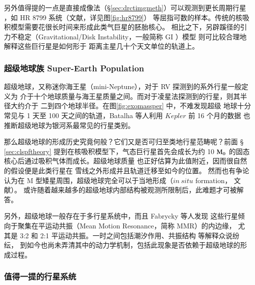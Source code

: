 另外值得提的一点是直接成像法（\S \ref{sec:drctimgmeth}）可以观测到更长周期行星
，如 HR 8799 系统（文献，详见图\ref{fig:hr8799}）
等屈指可数的样本。传统的核吸积模型需要花很长时间来形成此类气巨星的胚胎核心。
相比之下，另辟蹊径的引力不稳定（Gravitational/Disk Instability，一般简称 GI ）模型
\cite{Kuiper1951,Cameron1978,Boss1997}则可比较合理地解释这些巨行星是如何形于
距离主星几十个天文单位的轨道上\cite{Durisen2007}。



\subsubsection{超级地球族  Super-Earth Population}

超级地球，又称迷你海王星（mini-Neptune），对于 RV 探测到的系外行星一般定义为
介于十个地球质量与海王星质量之间。而对于凌星法探测到的行星，则其半径大约介于
二到四个地球半径\cite{Haghighipour2011}。在图\ref{fig:exomassper} 中，不难发现超级
地球十分常见与 1 天至 100 天之间的轨道，Batalha 等人利用 $Kepler$ 前 16 个月的数据
也推断超级地球为银河系最常见的行星类别\cite{Batalha2013}。

那么超级地球的形成历史究竟何般？它们又是否可归至类地行星范畴呢？前面 \S 
\ref{sec:clspftheory} 提到在核吸积模型下，气态巨行星首先会成长为约 10 
$\mathrm{M}_\oplus$ 的固态核心后通过吸积气体而成长\cite{Guillot2005}。超级地球质量
也正好估算为此值附近\cite{Lissauer2011MRR}，因而很自然的假设便是此类行星在
雪线之外形成并且轨道迁移至如今的位置\cite{Terquem2007,Kennedy2008,IdaLin2008}。
然而也有争论认为在 M 型矮星周围，超级地球完全可以于当地形成（$in\:situ$ formation，
文献）。
或许随着越来越多的超级地球内部结构被观测所限制后，此难题才可被解答\cite{Lissauer2014}。

另外，超级地球一般存在于多行星系统中\cite{Borucki2011}，而且 Fabrycky 等人发现
这些行星倾向于聚集在平运动共振（Mean Motion Resonance，简称 MMR）的内边缘，
尤其是 3:2 和 2:1 平运动共振\cite{Fabrycky2014}。一时之间包括潮汐作用、共振结构
等解释众说纷纭\cite{LithwickWu2012,Lee2013,Batygin2013,Baruteau2013,Delisle2014,Chatterjee2015}，
到如今也尚未弄清其中的动力学机制，包括此现象是否依赖于超级地球的形成过程。

\subsubsection{值得一提的行星系统}  \label{sec:pexample}

